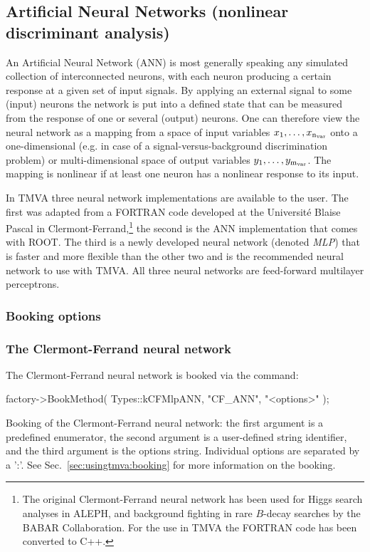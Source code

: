 \subsection{Artificial Neural Networks
 (nonlinear discriminant analysis)}
\label{sec:ann}

An Artificial Neural Network  (ANN)
is most generally speaking any simulated collection of interconnected
neurons, with each neuron producing a certain response at a given set
of input signals. By applying an external signal to some (input)
neurons the network is put into a defined state that can be measured
from the response of one or several (output) neurons. One can therefore
view the neural network as a mapping from a space of input variables
$x_1,\dots, x_{\rm n_{var}}$ onto a one-dimensional (e.g. in case of a 
signal-versus-background discrimination problem) or multi-dimensional 
space of output variables $y_1,\dots, y_{\rm m_{var}}$. The mapping is 
nonlinear if at least one neuron has a nonlinear response to its input.

In TMVA three neural network implementations are available to the user. The
first was adapted from a FORTRAN code developed at the Universit\'e Blaise
Pascal in Clermont-Ferrand,\footnote
{
   The original Clermont-Ferrand neural network has been used for Higgs 
   search analyses in ALEPH, and background fighting in rare $B$-decay
   searches by the BABAR Collaboration. For the use in TMVA the FORTRAN 
   code has been converted to C++.
} 
the second is the ANN implementation that comes with ROOT. The third is 
a newly developed neural network (denoted {\em MLP}) that is faster and more 
flexible than the other two and is the recommended neural network to use with 
TMVA. All three neural networks are feed-forward multilayer perceptrons.

\subsubsection{Booking options}

\subsubsection*{The Clermont-Ferrand neural network}

The Clermont-Ferrand neural network is booked via the command:
\begin{codeexample}
\begin{tmvacode}
factory->BookMethod( Types::kCFMlpANN, "CF_ANN", "<options>" );
\end{tmvacode}
\caption[.]{\codeexampleCaptionSize Booking of the Clermont-Ferrand neural network: the first 
            argument is a predefined enumerator, the second argument is a user-defined string 
            identifier, and the third argument is the options string.
            Individual options are separated by a ':'. 
            See Sec.~\ref{sec:usingtmva:booking} for more information on the booking.}
\end{codeexample}

